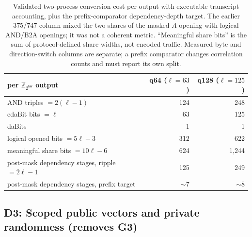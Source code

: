 \documentclass[11pt]{article}
\newcommand{\Z}{\mathbb{Z}}
\newcommand{\bw}{\mathsf{bw}}
\newcommand{\modtwo}{\Z_{2^{\bw}}}
\begin{document}
\begin{table}[ht]
\centering
\small
\begin{tabular}{lrr}
\toprule
per $\modtwo$ output & q64 ($\ell{=}63$) & q128 ($\ell{=}125$)\\
\midrule
AND triples $=2(\ell{-}1)$ & 124 & 248\\
edaBit bits $=\ell$        & 63  & 125\\
daBits                     & 1   & 1\\
logical opened bits $=5\ell-3$ & 312 & 622\\
meaningful share bits $=10\ell-6$ & 624 & 1{,}244\\
post-mask dependency stages, ripple $=2\ell{-}1$ & 125 & 249\\
post-mask dependency stages, prefix target & $\sim$7 & $\sim$8\\
\bottomrule
\end{tabular}
\caption{Validated two-process conversion cost per output with executable
transcript accounting, plus the prefix-comparator dependency-depth target.
The earlier 375/747 column mixed the two shares of the masked-$A$ opening with
logical AND/B2A openings; it was not a coherent metric. ``Meaningful share
bits'' is the sum of protocol-defined share widths, not encoded traffic.
Measured byte and direction-switch columns are separate; a prefix comparator
changes correlation counts and must report its own split.}
\label{tab:convert}
\end{table}

\subsection{D3: Scoped public vectors and private randomness (removes G3)}
\label{sec:design-seeds}
\end{document}
